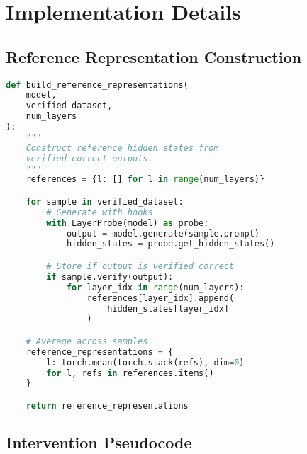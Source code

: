 \documentclass[11pt]{article}
\begin{document}
\section{Implementation Details}

\subsection{Reference Representation Construction}

\begin{lstlisting}[language=Python, caption=Building Reference Representations]
def build_reference_representations(
    model,
    verified_dataset,
    num_layers
):
    """
    Construct reference hidden states from
    verified correct outputs.
    """
    references = {l: [] for l in range(num_layers)}

    for sample in verified_dataset:
        # Generate with hooks
        with LayerProbe(model) as probe:
            output = model.generate(sample.prompt)
            hidden_states = probe.get_hidden_states()

        # Store if output is verified correct
        if sample.verify(output):
            for layer_idx in range(num_layers):
                references[layer_idx].append(
                    hidden_states[layer_idx]
                )

    # Average across samples
    reference_representations = {
        l: torch.mean(torch.stack(refs), dim=0)
        for l, refs in references.items()
    }

    return reference_representations
\end{lstlisting}

\subsection{Intervention Pseudocode}
\end{document}
